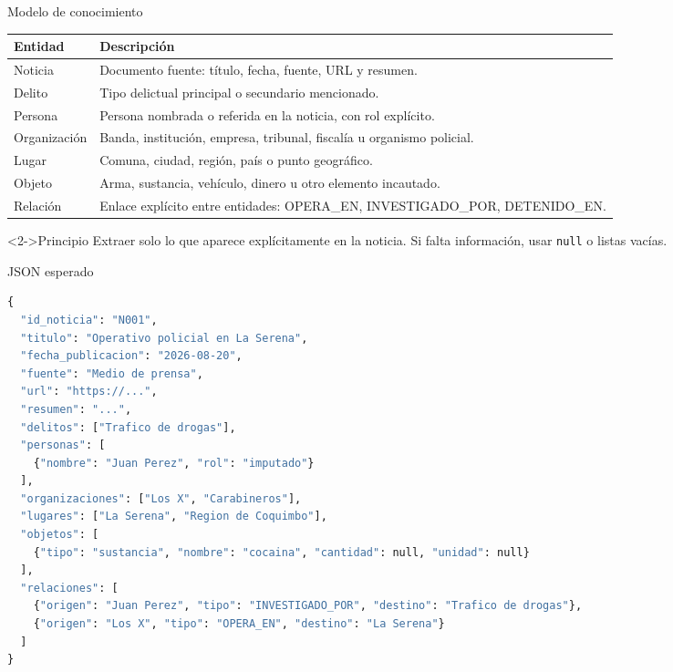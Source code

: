 \documentclass[11pt,aspectratio=169]{beamer}
\newcommand{\code}[1]{\texttt{#1}}
\begin{document}
\begin{frame}{Modelo de conocimiento}
\scriptsize
\begin{center}
\begin{tabular}{p{3.0cm}p{7.8cm}}
\toprule
\textbf{Entidad} & \textbf{Descripción} \\
\midrule
Noticia & Documento fuente: título, fecha, fuente, URL y resumen. \\
Delito & Tipo delictual principal o secundario mencionado. \\
Persona & Persona nombrada o referida en la noticia, con rol explícito. \\
Organización & Banda, institución, empresa, tribunal, fiscalía u organismo policial. \\
Lugar & Comuna, ciudad, región, país o punto geográfico. \\
Objeto & Arma, sustancia, vehículo, dinero u otro elemento incautado. \\
Relación & Enlace explícito entre entidades: OPERA\_EN, INVESTIGADO\_POR, DETENIDO\_EN. \\
\bottomrule
\end{tabular}
\end{center}

\begin{block}<2->{Principio}
Extraer solo lo que aparece explícitamente en la noticia. Si falta información, usar \code{null} o listas vacías.
\end{block}
\end{frame}

\begin{frame}[fragile]{JSON esperado}
\tiny
\begin{lstlisting}[language=Python]
{
  "id_noticia": "N001",
  "titulo": "Operativo policial en La Serena",
  "fecha_publicacion": "2026-08-20",
  "fuente": "Medio de prensa",
  "url": "https://...",
  "resumen": "...",
  "delitos": ["Trafico de drogas"],
  "personas": [
    {"nombre": "Juan Perez", "rol": "imputado"}
  ],
  "organizaciones": ["Los X", "Carabineros"],
  "lugares": ["La Serena", "Region de Coquimbo"],
  "objetos": [
    {"tipo": "sustancia", "nombre": "cocaina", "cantidad": null, "unidad": null}
  ],
  "relaciones": [
    {"origen": "Juan Perez", "tipo": "INVESTIGADO_POR", "destino": "Trafico de drogas"},
    {"origen": "Los X", "tipo": "OPERA_EN", "destino": "La Serena"}
  ]
}
\end{lstlisting}
\end{frame}
\end{document}
